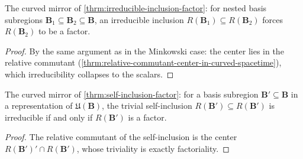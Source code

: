 \begin{theorem}
    \label{thrm:irreducible-inclusion-factor-in-curved-spacetime}
    \leanok
    The curved mirror of \ref{thrm:irreducible-inclusion-factor}: for nested basis subregions $\mathbf{B}_1 \subseteq \mathbf{B}_2 \subseteq \mathbf{B}$, an irreducible inclusion $R(\mathbf{B}_1) \subseteq R(\mathbf{B}_2)$ forces $R(\mathbf{B}_2)$ to be a factor.
\end{theorem}
\begin{proof}
    \leanok
    By the same argument as in the Minkowski case: the center lies in the relative commutant (\ref{thrm:relative-commutant-center-in-curved-spacetime}), which irreducibility collapses to the scalars.
\end{proof}

\begin{theorem}
    \label{thrm:self-inclusion-factor-in-curved-spacetime}
    \leanok
    The curved mirror of \ref{thrm:self-inclusion-factor}: for a basis subregion $\mathbf{B}' \subseteq \mathbf{B}$ in a representation of $\mathfrak{U}(\mathbf{B})$, the trivial self-inclusion $R(\mathbf{B}') \subseteq R(\mathbf{B}')$ is irreducible if and only if $R(\mathbf{B}')$ is a factor.
\end{theorem}
\begin{proof}
    \leanok
    The relative commutant of the self-inclusion is the center $R(\mathbf{B}')' \cap R(\mathbf{B}')$, whose triviality is exactly factoriality.
\end{proof}


